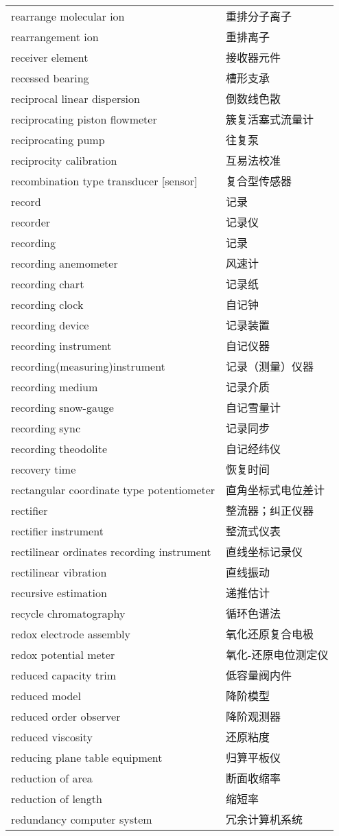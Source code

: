 \documentclass[
]{article}
\begin{document}
\begin{longtable}[]{@{}ll@{}}
rearrange molecular ion & 重排分子离子 \\
rearrangement ion & 重排离子 \\
receiver element & 接收器元件 \\
recessed bearing & 槽形支承 \\
reciprocal linear dispersion & 倒数线色散 \\
reciprocating piston flowmeter & 簇复活塞式流量计 \\
reciprocating pump & 往复泵 \\
reciprocity calibration & 互易法校准 \\
recombination type transducer {[}sensor{]} & 复合型传感器 \\
record & 记录 \\
recorder & 记录仪 \\
recording & 记录 \\
recording anemometer & 风速计 \\
recording chart & 记录纸 \\
recording clock & 自记钟 \\
recording device & 记录装置 \\
recording instrument & 自记仪器 \\
recording(measuring)instrument & 记录（测量）仪器 \\
recording medium & 记录介质 \\
recording snow-gauge & 自记雪量计 \\
recording sync & 记录同步 \\
recording theodolite & 自记经纬仪 \\
recovery time & 恢复时间 \\
rectangular coordinate type potentiometer & 直角坐标式电位差计 \\
rectifier & 整流器；纠正仪器 \\
rectifier instrument & 整流式仪表 \\
rectilinear ordinates recording instrument & 直线坐标记录仪 \\
rectilinear vibration & 直线振动 \\
recursive estimation & 递推估计 \\
recycle chromatography & 循环色谱法 \\
redox electrode assembly & 氧化还原复合电极 \\
redox potential meter & 氧化-还原电位测定仪 \\
reduced capacity trim & 低容量阀内件 \\
reduced model & 降阶模型 \\
reduced order observer & 降阶观测器 \\
reduced viscosity & 还原粘度 \\
reducing plane table equipment & 归算平板仪 \\
reduction of area & 断面收缩率 \\
reduction of length & 缩短率 \\
redundancy computer system & 冗余计算机系统 \\
\bottomrule()
\end{longtable}
\end{document}
